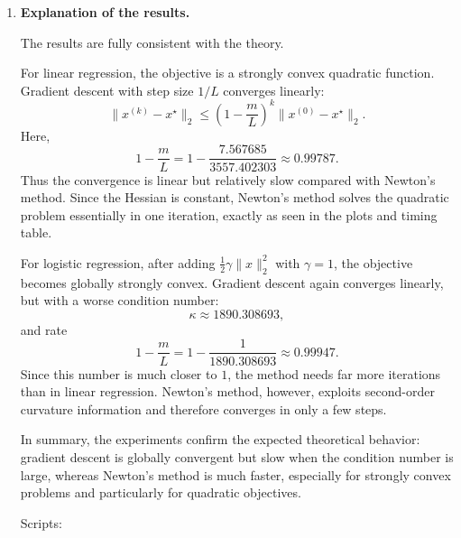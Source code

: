 \documentclass[11pt,letter,notitlepage]{article}
\theoremstyle{definition}
\begin{document}
\begin{solution}
\begin{enumerate}[label=(\alph*)]
\medskip
\noindent
\textbf{Logistic regression:}
\[
\begin{array}{c|ccc}
\text{Method} & \epsilon=10^{-2} & \epsilon=10^{-3} & \epsilon=10^{-4} \\
\hline
\text{Gradient descent} &
(4395,\;1.000440\text{ s}) &
(8109,\;1.827914\text{ s}) &
(11981,\;2.820052\text{ s})
\\
\text{Newton} &
(7,\;0.007921\text{ s}) &
(7,\;0.007921\text{ s}) &
(8,\;0.008460\text{ s})
\end{array}
\]

Each pair above is of the form $(\text{iterations}, \text{time})$.

\item \textbf{Explanation of the results.}

The results are fully consistent with the theory.

For linear regression, the objective is a strongly convex quadratic function. Gradient descent with step size $1/L$ converges linearly:
\[
\|x^{(k)}-x^\star\|_2
\le
\left(1-\frac{m}{L}\right)^k
\|x^{(0)}-x^\star\|_2.
\]
Here,
\[
1-\frac{m}{L}
=
1-\frac{7.567685}{3557.402303}
\approx 0.99787.
\]
Thus the convergence is linear but relatively slow compared with Newton's method. Since the Hessian is constant, Newton's method solves the quadratic problem essentially in one iteration, exactly as seen in the plots and timing table.

For logistic regression, after adding $\frac12\gamma\|x\|_2^2$ with $\gamma=1$, the objective becomes globally strongly convex. Gradient descent again converges linearly, but with a worse condition number:
\[
\kappa \approx 1890.308693,
\]
and rate
\[
1-\frac{m}{L}
=
1-\frac{1}{1890.308693}
\approx 0.99947.
\]
Since this number is much closer to $1$, the method needs far more iterations than in linear regression. Newton's method, however, exploits second-order curvature information and therefore converges in only a few steps.

In summary, the experiments confirm the expected theoretical behavior: gradient descent is globally convergent but slow when the condition number is large, whereas Newton's method is much faster, especially for strongly convex problems and particularly for quadratic objectives.

Scripts:


\end{enumerate}

\end{solution}
\end{document}
